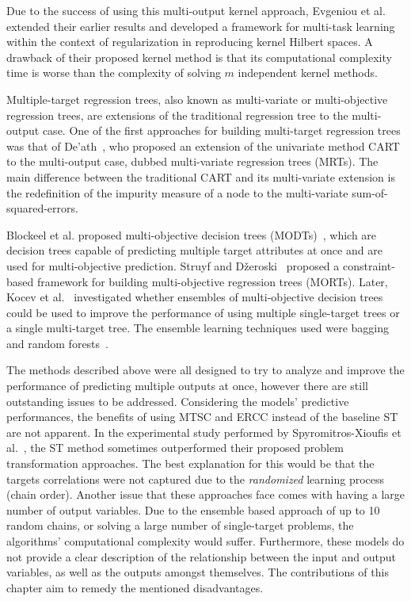 \documentclass[reqno]{vcuthesis}
\numberwithin{equation}{chapter}
\begin{document}
Due to the success of using this multi-output kernel approach, Evgeniou et al.~\cite{Evgeniou2005} extended their earlier results and developed a framework for multi-task learning within the context of regularization in reproducing kernel Hilbert spaces. A drawback of their proposed kernel method is that its computational complexity time is worse than the complexity of solving $m$ independent kernel methods.

Multiple-target regression trees, also known as multi-variate or multi-objective regression trees, are extensions of the traditional regression tree to the multi-output case. One of the first approaches for building multi-target regression trees was that of De'ath~\cite{de2002multivariate}, who proposed an extension of the univariate method CART~\cite{breiman1984classification} to the multi-output case, dubbed multi-variate regression trees (MRTs). The main difference between the traditional CART and its multi-variate extension is the redefinition of the impurity measure of a node to the multi-variate sum-of-squared-errors.

Blockeel et al. proposed multi-objective decision trees (MODTs)~\cite{blockeel1998top,kocev2009using}, which are decision trees capable of predicting multiple target attributes at once and are used for multi-objective prediction. Struyf and D{\v{z}}eroski~\cite{struyf2005constraint} proposed a constraint-based framework for building multi-objective regression trees (MORTs). Later, Kocev et al.~\cite{Kocev2007} investigated whether ensembles of multi-objective decision trees could be used to improve the performance of using multiple single-target trees or a single multi-target tree. The ensemble learning techniques used were bagging~\cite{Breiman1996} and random forests~\cite{breiman2001random}.

The methods described above were all designed to try to analyze and improve the performance of predicting multiple outputs at once, however there are still outstanding issues to be addressed. Considering the models' predictive performances, the benefits of using MTSC and ERCC instead of the baseline ST are not apparent. In the experimental study performed by Spyromitros-Xioufis et al.~\cite{Spyromitros2014}, the ST method sometimes outperformed their proposed problem transformation approaches. The best explanation for this would be that the targets correlations were not captured due to the \textit{randomized} learning process (chain order). Another issue that these approaches face comes with having a large number of output variables. Due to the ensemble based approach of up to 10 random chains, or solving a large number of single-target problems, the algorithms' computational complexity would suffer. Furthermore, these models do not provide a clear description of the relationship between the input and output variables, as well as the outputs amongst themselves. The contributions of this chapter aim to remedy the mentioned disadvantages.
\end{document}
